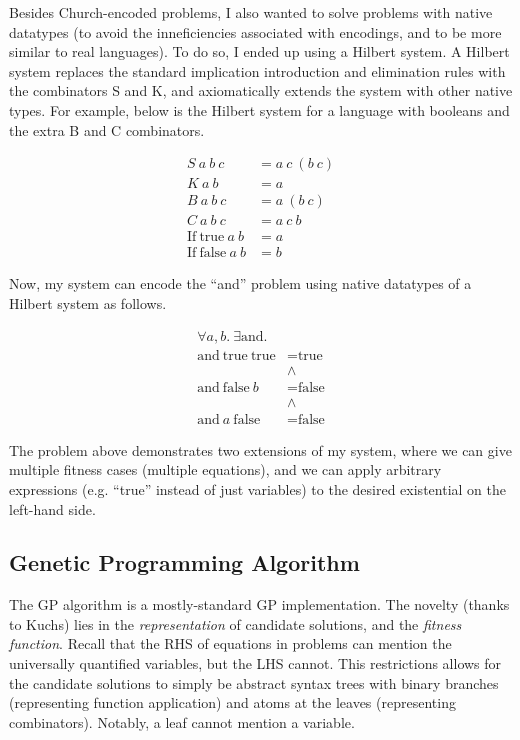 \documentclass{article}
\newcommand{\n}[1]{\textrm{#1}}
\begin{document}
Besides Church-encoded problems, I also wanted to solve problems with
native datatypes (to avoid the inneficiencies associated with
encodings, and to be more similar to real languages).
To do so, I ended up using a Hilbert system. A Hilbert system replaces
the standard implication introduction and elimination rules with the
combinators S and K, and axiomatically extends the system with other
native types. For example, below is the Hilbert system for a language
with booleans and the extra B and C combinators.

\begin{align*}
S ~ a ~ b ~ c &= a ~ c ~ (b ~ c)\\
K ~ a ~ b &= a\\
B ~ a ~ b ~ c &= a ~ (b ~ c)\\
C ~ a ~ b ~ c &= a ~ c ~ b\\
\n{If} ~ \n{true} ~ a ~ b &= a\\
\n{If} ~ \n{false} ~ a ~ b &= b
\end{align*}

Now, my system can encode the ``and'' problem using native datatypes of a
Hilbert system as follows.

\begin{align*}
\forall a,b . ~ \exists \n{and} .\\
\n{and} ~ \n{true} ~ \n{true} &= \n{true}\\
&\land\\
\n{and} ~ \n{false} ~ b &= \n{false}\\
&\land\\
\n{and} ~ a ~ \n{false} &= \n{false}
\end{align*}

The problem above demonstrates two extensions of my system, where we
can give multiple fitness cases (multiple equations), and we can apply
arbitrary expressions (e.g. ``true'' instead of just variables) to the
desired existential on the left-hand side.

\subsection{Genetic Programming Algorithm}

The GP algorithm is a mostly-standard GP implementation. The novelty
(thanks to Kuchs) lies in the \textit{representation} of candidate
solutions, and the \textit{fitness function}. Recall that the RHS of
equations in problems can mention the universally quantified
variables, but the LHS cannot. This restrictions allows for the
candidate solutions to simply be abstract syntax trees with binary
branches (representing function application) and atoms at the leaves
(representing combinators). Notably, a leaf cannot mention a variable.
\end{document}
